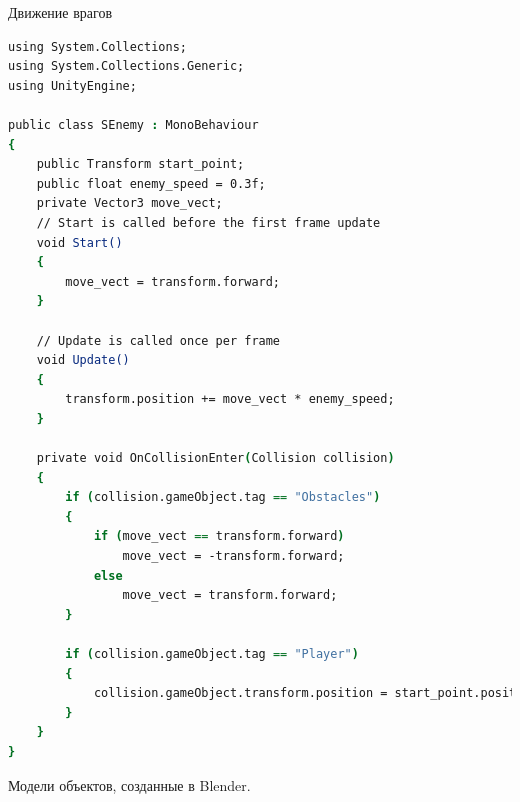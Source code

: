  Движение врагов

\begin{lstlisting}[language=csh]
using System.Collections;
using System.Collections.Generic;
using UnityEngine;

public class SEnemy : MonoBehaviour
{
    public Transform start_point;
    public float enemy_speed = 0.3f;
    private Vector3 move_vect;
    // Start is called before the first frame update
    void Start()
    {
        move_vect = transform.forward;
    }

    // Update is called once per frame
    void Update()
    {
        transform.position += move_vect * enemy_speed;
    }

    private void OnCollisionEnter(Collision collision)
    {
        if (collision.gameObject.tag == "Obstacles")
        {
            if (move_vect == transform.forward)
                move_vect = -transform.forward;
            else
                move_vect = transform.forward;
        }

        if (collision.gameObject.tag == "Player")
        {
            collision.gameObject.transform.position = start_point.position;
        }
    }
}
\end{lstlisting}


Модели объектов, созданные в Blender.

